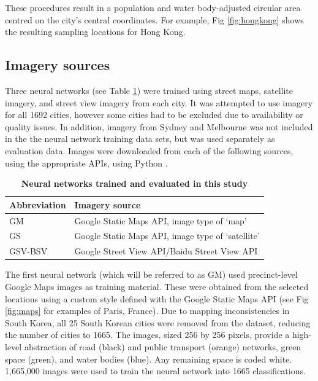 \documentclass[10pt,letterpaper]{article}
\begin{document}
These procedures result in a population and water body-adjusted circular area centred on the city's central coordinates. For example, Fig \ref{fig:hongkong} shows the resulting sampling locations for Hong Kong.





\label{methodsimagery}
\subsection*{Imagery sources}


Three neural networks (see Table \ref{tab:neuralnetworks}) were trained using street maps, satellite imagery, and street view imagery from each city. It was attempted to use imagery for all 1692 cities, however some cities had to be excluded due to availability or quality issues. In addition, imagery from Sydney and Melbourne was not included in the the neural network training data sets, but was used separately as evaluation data. Images were downloaded from each of the following sources, using the appropriate APIs, using Python \cite{Python2016}.


\begin{table}[!htbp]
\caption{\bf Neural networks trained and evaluated in this study \label{tab:neuralnetworks}}     
\begin{tabular}{ l l }
 \hline Abbreviation   &  Imagery source \\ \hline
GM & Google Static Maps API, image type of `map'     \\ 
GS & Google Static Maps API, image type of `satellite'      \\
GSV-BSV & Google Street View API/Baidu Street View API     \\ \hline

\end{tabular}
\end{table}

The first neural network (which will be referred to as GM) used precinct-level Google Maps images as training material. These were obtained from the selected locations using a custom style defined with the Google Static Maps API \cite{GoogleStatic2017} (see Fig \ref{fig:maps} for examples of Paris, France). Due to mapping inconsistencies in South Korea, all 25 South Korean cities were removed from the dataset, reducing the number of cities to 1665. The images, sized 256 by 256 pixels, provide a high-level abstraction of road (black) and public transport (orange) networks, green space (green), and water bodies (blue). Any remaining space is coded white. 1,665,000 images were used to train the neural network into 1665 classifications.
\end{document}

